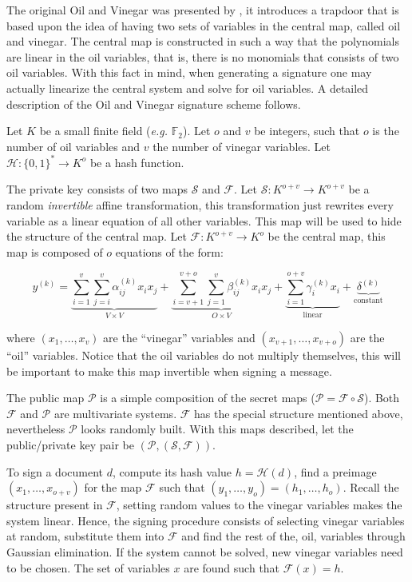 \documentclass{ufsctex/ufsctex}
\begin{document}
The original Oil and Vinegar was presented by \cite{patarin1997ov}, it
introduces a trapdoor that is based upon the idea of having two sets of
variables in the central map, called oil and vinegar. The central map is
constructed in such a way that the polynomials are linear in the oil variables,
that is, there is no monomials that consists of two oil variables. With this
fact in mind, when generating a signature one may actually linearize the
central system and solve for oil variables. A detailed description of the Oil
and Vinegar signature scheme follows.

Let $K$ be a small finite field (\textit{e.g.} $\mathbb{F}_2$). Let $o$ and $v$
be integers, such that $o$ is the number of oil variables and $v$ the number of
vinegar variables. Let $\mathcal{H}: \{0,1\}^* \to K^o$ be a hash function.

The private key consists of two maps $\mathcal{S}$ and $\mathcal{F}$. Let
$\mathcal{S}: K^{o+v} \to K^{o+v}$ be a random \textit{invertible} affine
transformation, this transformation just rewrites every variable as a linear
equation of all other variables. This map will be used to hide the structure of
the central map. Let $\mathcal{F}: K^{o+v} \to K^{o}$ be the central map, this
map is composed of $o$ equations of the form:

\begin{equation}\label{eq:ovpolynomial}
y^{(k)} =
\underbrace{\sum_{i=1}^{v}\sum_{j=i}^{v} \alpha^{(k)}_{ij} x_i x_j}_{
V \times V} +
\underbrace{\sum_{i=v+1}^{v+o}\sum_{j=1}^{v} \beta^{(k)}_{ij} x_i x_j}_{
O \times V} +
\underbrace{\sum_{i=1}^{o+v} \gamma^{(k)}_{i} x_i}_{\text{linear}} +
\underbrace{\delta^{(k)}}_{\text{constant}}
\end{equation}

where $(x_1,\dots,x_v)$ are the ``vinegar'' variables and
$(x_{v+1},\dots,x_{v+o})$ are the ``oil'' variables. Notice that the oil
variables do not multiply themselves, this will be important to make this map
invertible when signing a message.

The public map $\mathcal{P}$ is a simple composition of the secret maps
($\mathcal{P} = \mathcal{F} \circ \mathcal{S}$). Both $\mathcal{F}$ and
$\mathcal{P}$ are multivariate systems. $\mathcal{F}$ has the special structure
mentioned above, nevertheless $\mathcal{P}$ looks randomly built. With this
maps described, let the public/private key pair be
$(\mathcal{P},(\mathcal{S},\mathcal{F}))$.

To sign a document $d$, compute its hash value $h = \mathcal{H}(d)$, find a
preimage $(x_1,\dots,x_{o+v})$ for the map $\mathcal{F}$ such that
$(y_1,\dots,y_o) = (h_1,\dots,h_o)$. Recall the structure present in
$\mathcal{F}$, setting random values to the vinegar variables makes the system
linear. Hence, the signing procedure consists of selecting vinegar variables at
random, substitute them into $\mathcal{F}$ and find the rest of the, oil,
variables through Gaussian elimination. If the system cannot be solved, new
vinegar variables need to be chosen. The set of variables $x$ are found such
that $\mathcal{F}(x)=h$.
\end{document}
